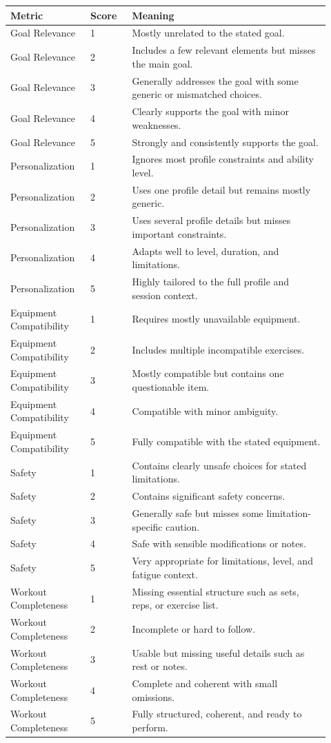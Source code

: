 \documentclass[12pt]{article}
\begin{document}
\begin{longtable}{p{0.22\linewidth}p{0.12\linewidth}p{0.58\linewidth}}
\toprule
Metric & Score & Meaning \\
\midrule
Goal Relevance & 1 & Mostly unrelated to the stated goal. \\
Goal Relevance & 2 & Includes a few relevant elements but misses the main goal. \\
Goal Relevance & 3 & Generally addresses the goal with some generic or mismatched choices. \\
Goal Relevance & 4 & Clearly supports the goal with minor weaknesses. \\
Goal Relevance & 5 & Strongly and consistently supports the goal. \\
Personalization & 1 & Ignores most profile constraints and ability level. \\
Personalization & 2 & Uses one profile detail but remains mostly generic. \\
Personalization & 3 & Uses several profile details but misses important constraints. \\
Personalization & 4 & Adapts well to level, duration, and limitations. \\
Personalization & 5 & Highly tailored to the full profile and session context. \\
Equipment Compatibility & 1 & Requires mostly unavailable equipment. \\
Equipment Compatibility & 2 & Includes multiple incompatible exercises. \\
Equipment Compatibility & 3 & Mostly compatible but contains one questionable item. \\
Equipment Compatibility & 4 & Compatible with minor ambiguity. \\
Equipment Compatibility & 5 & Fully compatible with the stated equipment. \\
Safety & 1 & Contains clearly unsafe choices for stated limitations. \\
Safety & 2 & Contains significant safety concerns. \\
Safety & 3 & Generally safe but misses some limitation-specific caution. \\
Safety & 4 & Safe with sensible modifications or notes. \\
Safety & 5 & Very appropriate for limitations, level, and fatigue context. \\
Workout Completeness & 1 & Missing essential structure such as sets, reps, or exercise list. \\
Workout Completeness & 2 & Incomplete or hard to follow. \\
Workout Completeness & 3 & Usable but missing useful details such as rest or notes. \\
Workout Completeness & 4 & Complete and coherent with small omissions. \\
Workout Completeness & 5 & Fully structured, coherent, and ready to perform. \\
\bottomrule
\end{longtable}
\end{document}
